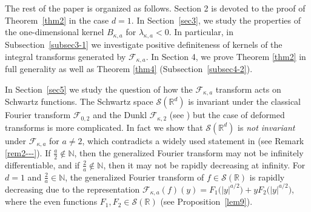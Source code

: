 \documentclass[12pt,twoside,reqno]{amsart}\usepackage[cp1251]{inputenc}
\theoremstyle{plain}
\theoremstyle{remark}
\begin{document}
The rest of the paper is organized as follows. Section 2 is devoted to the proof of
Theorem~\ref{thm2} in the case $d=1$.
In  Section~\ref{sec3}, we study the properties of the one-dimensional kernel $B_{\kappa,a}$ for
$\lambda_{\kappa,a}<0$. In particular, in
Subsection~\ref{subsec3-1} we investigate positive definiteness of kernels of the integral transforms generated by $\mathcal{F}_{\kappa,a}$.
In Section 4, we prove Theorem \ref{thm2} in full generality as well as  Theorem \ref{thm4} (Subsection~\ref{subsec4-2}).



In  Section~\ref{sec5} we study the question of how the $\mathcal{F}_{\kappa,a}$ transform  acts on  Schwartz functions.
The Schwartz space $\mathcal{S}(\mathbb{R}^{d})$ is invariant under the classical  Fourier transform $\mathcal{F}_{0,2}$ and
the Dunkl $\mathcal{F}_{\kappa,2}$ (see \cite{jeu}) but the case of deformed transforms is more complicated.
In fact we show that  %
$\mathcal{S}(\mathbb{R}^d)$  is {\it not invariant} under $\mathcal{F}_{\kappa,a}$ for  $a\neq 2$, which contradicts a widely used statement in  \cite{Jo16}
(see Remark \ref{rem2---}).
If $\frac{a}{2}\notin\mathbb{N}$, then the generalized Fourier transform may  not be
infinitely differentiable, and if  $\frac{2}{a}\notin\mathbb{N}$, then
it may  not be rapidly decreasing at infinity. For $d=1$ and $\frac{2}{a}\in\mathbb{N}$,
the generalized Fourier transform of $f\in\mathcal{S}(\mathbb{R})$ is rapidly decreasing due to the representation
$\mathcal{F}_{\kappa,a}(f)(y)=F_1\bigl(|y|^{a/2}\bigr)+yF_2\bigl(|y|^{a/2}\bigr)$,
where the even functions  $F_1,F_2\in\mathcal{S}(\mathbb{R})$ (see Proposition~\ref{lem9}).
\end{document}

